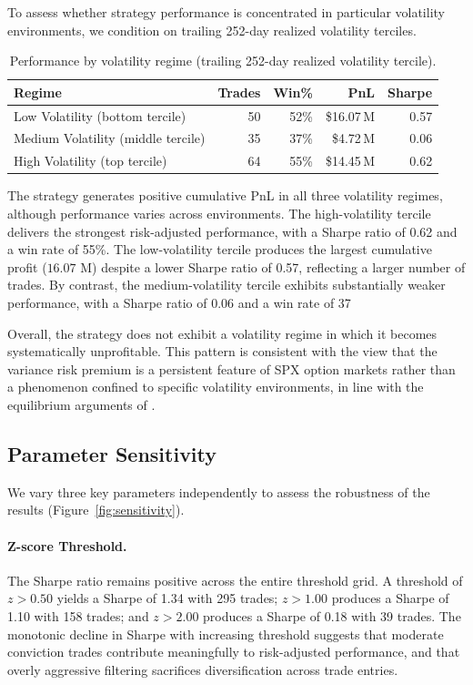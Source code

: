 \documentclass[11pt,a4paper]{article}
\begin{document}
To assess whether strategy performance is concentrated in particular volatility environments, we condition on trailing 252-day realized volatility terciles.

\begin{table}[H]
\centering
\caption{Performance by volatility regime (trailing 252-day realized volatility tercile).}
\label{tab:regime}
\begin{tabular}{@{}lrrrr@{}}
\toprule
\textbf{Regime} & \textbf{Trades} & \textbf{Win\%} & \textbf{PnL} & \textbf{Sharpe} \\
\midrule
Low Volatility (bottom tercile)    & 50 & 52\% & \$16.07\,M & 0.57 \\
Medium Volatility (middle tercile) & 35 & 37\% & \$4.72\,M  & 0.06 \\
High Volatility (top tercile)      & 64 & 55\% & \$14.45\,M & 0.62 \\
\bottomrule
\end{tabular}
\end{table}

The strategy generates positive cumulative PnL in all three volatility regimes, although performance varies across environments. The high-volatility tercile delivers the strongest risk-adjusted performance, with a Sharpe ratio of 0.62 and a win rate of 55\%. The low-volatility tercile produces the largest cumulative profit ($16.07$ M) despite a lower Sharpe ratio of 0.57, reflecting a larger number of trades. By contrast, the medium-volatility tercile exhibits substantially weaker performance, with a Sharpe ratio of 0.06 and a win rate of 37%

Overall, the strategy does not exhibit a volatility regime in which it becomes systematically unprofitable. This pattern is consistent with the view that the variance risk premium is a persistent feature of SPX option markets rather than a phenomenon confined to specific volatility environments, in line with the equilibrium arguments of \citet{drechsler2011whats}.

\subsection{Parameter Sensitivity}
\label{sec:param_sensitivity}

We vary three key parameters independently to assess the robustness of the results (Figure~\ref{fig:sensitivity}).

\paragraph{Z-score Threshold.}
The Sharpe ratio remains positive across the entire threshold grid.
A threshold of $z > 0.50$ yields a Sharpe of 1.34 with 295 trades; $z > 1.00$ produces a Sharpe of 1.10 with 158 trades; and $z > 2.00$ produces a Sharpe of 0.18 with 39 trades.
The monotonic decline in Sharpe with increasing threshold suggests that moderate conviction trades contribute meaningfully to risk-adjusted performance, and that overly aggressive filtering sacrifices diversification across trade entries.
\end{document}
